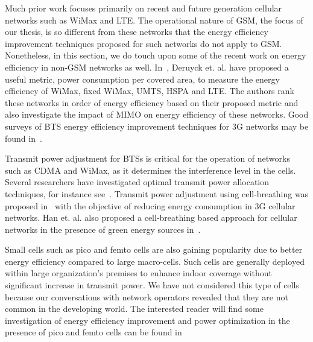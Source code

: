 Much prior work focuses primarily on recent and future generation cellular networks such as WiMax and LTE. The operational nature of GSM, the focus of our thesis, is so different from these networks that the energy efficiency improvement techniques proposed for such networks do not apply to GSM. Nonetheless, in this section, we do touch upon some of the recent work on energy efficiency in non-GSM networks as well. In~\cite{Deruyck20112036}, Deruyck et. al. have proposed a useful metric, power consumption per covered area, to measure the energy efficiency of WiMax, fixed WiMax, UMTS, HSPA and LTE. The authors rank these networks in order of energy efficiency based on their proposed metric and also investigate the impact of MIMO on energy efficiency of these networks. Good surveys of BTS energy efficiency improvement techniques for 3G networks may be found in~\cite{6056687,5783984}.

Transmit power adjustment for BTSs is critical for the operation of networks such as CDMA and WiMax, as it determines the interference level in the cells. Several researchers have investigated optimal transmit power allocation techniques, for instance see~\cite{Kavitha20131373,Xu:powercontrol:2013}. Transmit power adjustment using cell-breathing was proposed in~\cite{Bhaumik:2010:BSC:1851290.1851300} with the objective of reducing energy consumption in 3G cellular networks. Han et. al. also proposed a cell-breathing based approach for cellular networks in the presence of green energy sources in~\cite{6189819}.

Small cells such as pico and femto cells are also gaining popularity due to better energy efficiency compared to large macro-cells. Such cells are generally deployed within large organization's premises to enhance indoor coverage without significant increase in transmit power. We have not considered this type of cells because our conversations with network operators revealed that they are not common in the developing world. The interested reader will find some investigation of energy efficiency improvement and power optimization in the presence of pico and femto cells can be found in~\cite{6576465,6491498} 

